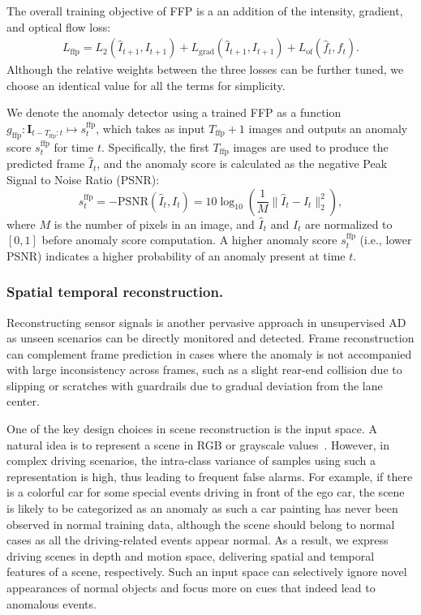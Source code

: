 The overall training objective of FFP is a an addition of the intensity, gradient, and optical flow loss:
\begin{equation}
\begin{aligned}
L_\text{ffp} = L_2 (\hat{I}_{t+1}, I_{t+1}) + L_\text{grad} (\hat{I}_{t+1}, I_{t+1}) + L_\text{of} (\hat{f}_t, f_t).
\end{aligned}
\end{equation}
Although the relative weights between the three losses can be further tuned, we choose an identical value for all the terms for simplicity.

We denote the anomaly detector using a trained FFP as a function $g_\text{ffp}: \mathbf{I}_{t - T_\text{ffp}:t} \mapsto s_t^\text{ffp}$, which takes as input $T_\text{ffp} + 1$ images and outputs an anomaly score $s_t^\text{ffp}$ for time $t$. Specifically, the first $T_\text{ffp}$ images are used to produce the predicted frame $\hat{I}_t$, and the anomaly score is calculated as the negative Peak Signal to Noise Ratio (PSNR):
\begin{equation}
s_t^\text{ffp} = -\text{PSNR}(\hat{I}_t, I_t) = 10\log_{10} \left(\frac{1}{M} \| \hat{I}_t - I_t \|_2^2\right),
\end{equation}
where $M$ is the number of pixels in an image, and $\hat{I}_t$ and $I_t$ are normalized to $[0, 1]$ before anomaly score computation. A higher anomaly score $s_t^\text{ffp}$ (i.e., lower PSNR) indicates a higher probability of an anomaly present at time $t$.

\subsubsection{Spatial temporal reconstruction.} Reconstructing sensor signals is another pervasive approach in unsupervised AD as unseen scenarios can be directly monitored and detected. Frame reconstruction can complement frame prediction in cases where the anomaly is not accompanied with large inconsistency across frames, such as a slight rear-end collision due to slipping or scratches with guardrails due to gradual deviation from the lane center.

One of the key design choices in scene reconstruction is the input space. A natural idea is to represent a scene in RGB or grayscale values~\citep{luo2017remembering,hasan2016learning}. However, in complex driving scenarios, the intra-class variance of samples using such a representation is high, thus leading to frequent false alarms. For example, if there is a colorful car for some special events driving in front of the ego car, the scene is likely to be categorized as an anomaly as such a car painting has never been observed in normal training data, although the scene should belong to normal cases as all the driving-related events appear normal. As a result, we express driving scenes in depth and motion space, delivering spatial and temporal features of a scene, respectively. Such an input space can selectively ignore novel appearances of normal objects and focus more on cues that indeed lead to anomalous events.


